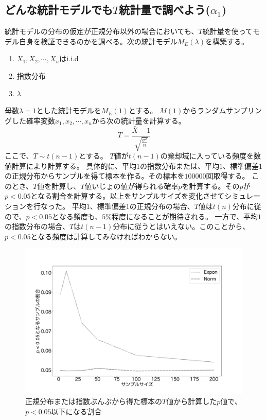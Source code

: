 \subsection{どんな統計モデルでも$T$統計量で調べよう($\alpha_1$)}
統計モデルの分布の仮定が正規分布以外の場合においても、$T$統計量を使ってモデル自身を検証できるのかを調べる。次の統計モデル$M_E(\lambda)$を構築する。
\begin{enumerate}
    \item $X_1,X_2,\cdots,X_n $はi.i.d
    \item 指数分布
    \item $\lambda$
\end{enumerate}
母数$\lambda=1$とした統計モデルを$M_E(1)$とする。
$M(1)$からランダムサンプリングした確率変数$x_1,x_2,\cdots,x_n$から次の統計量を計算する。
\begin{equation*}
    T = \frac{\bar{X}-1}{\sqrt{\frac{\sigma^2}{n}}}
\end{equation*}
ここで、$T \sim t(n-1)$とする。
$T$値が$t(n-1)$の棄却域に入っている頻度を数値計算により計算する。
具体的に、平均$1$の指数分布または、平均$1$、標準偏差$1$の正規分布からサンプルを得て標本を作る。その標本を$100000$回取得する。
このとき、$T$値を計算し、$T$値いじょの値が得られる確率$p$を計算する。その$p$が$p<0.05$となる割合を計算する。以上をサンプルサイズを変化させてシミュレーションを行なった。
平均$1$、標準偏差$1$の正規分布の場合、$T$値は$t(n)$分布に従ので、$p<0.05$となる頻度も、$5\%$程度になることが期待される。
一方で、平均$1$の指数分布の場合、$T$は$t(n-1)$分布に従うとはいえない。このことから、$p<0.05$となる頻度は計算してみなければわからない。


\begin{figure}
    \begin{center}
        \includegraphics[width=15cm]{./image/04_/t_test_expon_norm.pdf}
        \caption{正規分布または指数ぶんぷから得た標本の$T$値から計算した$p$値で、$p<0.05$以下になる割合}
    \end{center}
\end{figure}

